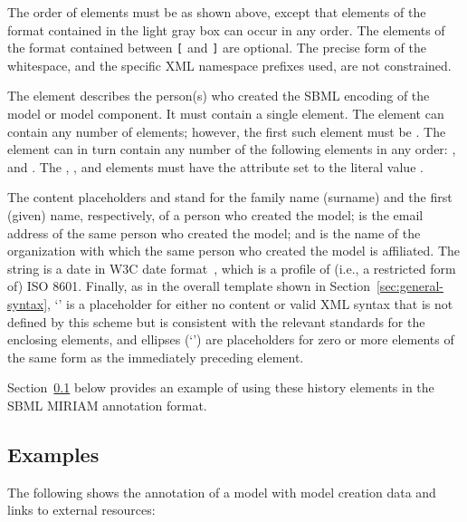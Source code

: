 The order of elements must be as shown above, except that elements
of the format contained in the light gray box can occur in any
order.  The elements of the format contained between \texttt{[}
and \texttt{]} are optional.  The precise form of the whitespace,
and the specific XML namespace prefixes used, are not constrained.

The  element describes the person(s) who created
the SBML encoding of the model or model component.  It must
contain a single  element.  The 
element can contain any number of elements; however, the first
such element must be .  The  element
can in turn contain any number of the following elements in any
order: ,  and .
The , , and
 elements must have the attribute
 set to the literal value .

The content placeholders \familyName and \givenName stand for the
family name (surname) and the first (given) name, respectively, of
a person who created the model; \emailAddress is the email address
of the same person who created the model; and \orgName is the name
of the organization with which the same person who created the
model is affiliated.  The string \historyDate is a date in W3C
date format~\citep{wolf:1998}, which is a profile of (i.e., a
restricted form of) ISO 8601.  Finally, as in the overall template
shown in Section~\ref{sec:general-syntax}, `\otherContent' is
a placeholder for either no content or valid XML syntax that is
not defined by this scheme but is consistent with the relevant
standards for the enclosing elements, and ellipses
(`\moreOfTheSame') are placeholders for zero or more elements of
the same form as the immediately preceding element.

Section~\ref{sec:annotation-examples} below provides an example of
using these history elements in the SBML MIRIAM annotation format.


\subsection{Examples}
\label{sec:annotation-examples}

The following shows the annotation of a model with model creation
data and links to external resources:

